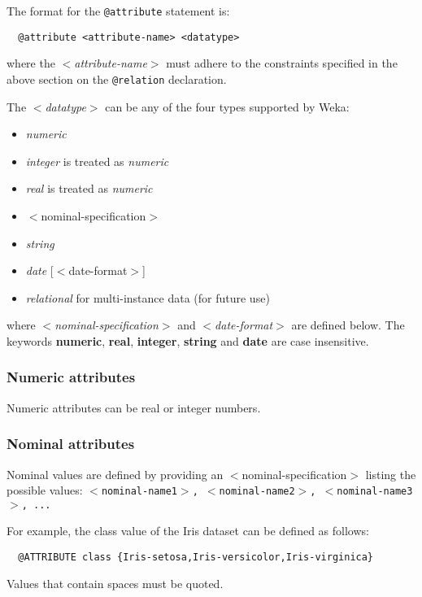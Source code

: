 The format for the \texttt{@attribute} statement is:

\begin{verbatim}
  @attribute <attribute-name> <datatype>
\end{verbatim}

where the \textit{$<$attribute-name$>$} must adhere to the constraints specified in the above section on the \texttt{@relation} declaration.

The \textit{$<$datatype$>$} can be any of the four types supported by Weka:
\begin{itemize}
	\item \textit{numeric}
	\item \textit{integer} is treated as \textit{numeric}
	\item \textit{real} is treated as \textit{numeric}
	\item $<$nominal-specification$>$
	\item \textit{string}
	\item \textit{date} [$<$date-format$>$]
	\item \textit{relational} for multi-instance data (for future use)
\end{itemize}

where \textit{$<$nominal-specification$>$} and \textit{$<$date-format$>$} are defined below. The keywords \textbf{numeric}, \textbf{real}, \textbf{integer}, \textbf{string} and \textbf{date} are case insensitive.


\subsubsection*{Numeric attributes}
Numeric attributes can be real or integer numbers. 


\subsubsection*{Nominal attributes}
Nominal values are defined by providing an $<$nominal-specification$>$ listing the possible values: \texttt{{$<$nominal-name1$>$, $<$nominal-name2$>$, $<$nominal-name3$>$, ...}}

For example, the class value of the Iris dataset can be defined as follows:

\begin{verbatim}
  @ATTRIBUTE class {Iris-setosa,Iris-versicolor,Iris-virginica}
\end{verbatim}

Values that contain spaces must be quoted. 


